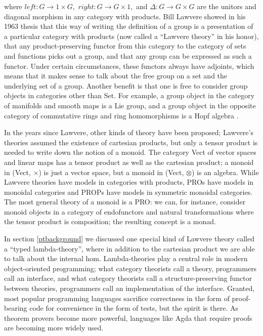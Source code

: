 \documentclass[12pt,twoside,openright]{report}
\newcommand{\maps}{\colon}
\begin{document}
where $left\maps G \to 1 \times G,$ $right\maps G \to G \times 1,$ and $\Delta\maps G \to G \times G$ are the unitors and diagonal morphism in any category with products.  Bill Lawvere showed in his 1963 thesis \cite{Lawvere} that this way of writing the definition of a group is a presentation of a particular category with products (now called a ``Lawvere theory'' in his honor), that any product-preserving functor from this category to the category of sets and functions picks out a group, and that any group can be expressed as such a functor.  Under certain circumstances, these functors always have adjoints, which means that it makes sense to talk about the free group on a set and the underlying set of a group.  Another benefit is that one is free to consider group objects in categories other than Set.  For example, a group object in the category of manifolds and smooth maps is a Lie group, and a group object in the opposite category of commutative rings and ring homomorphisms is a Hopf algebra \cite{nlabgroupobject}.

In the years since Lawvere, other kinds of theory have been proposed; Lawvere's theories assumed the existence of cartesian products, but only a tensor product is needed to write down the notion of a monoid.  The category Vect of vector spaces and linear maps has a tensor product as well as the cartesian product; a monoid in (Vect, $\times$) is just a vector space, but a monoid in (Vect, $\otimes$) is an algebra.  While Lawvere theories have models in categories with products, PROs have models in monoidal categories and PROPs have models in symmetric monoidal categories.  The most general theory of a monoid is a PRO: we can, for instance, consider monoid objects in a category of endofunctors and natural transformations where the tensor product is composition; the resulting concept is a monad.

In section \ref{ptbackground} we discussed one special kind of Lawvere theory called a ``typed lambda-theory'', where in addition to the cartesian product we are able to talk about the internal hom.  Lambda-theories play a central role in modern object-oriented programming; what category theorists call a theory, programmers call an interface, and what category theorists call a structure-preserving functor between theories, programmers call an implementation of the interface.  Granted, most popular programming languages sacrifice correctness in the form of proof-bearing code for convenience in the form of tests, but the spirit is there.  As theorem provers become more powerful, languages like Agda that require proofs are becoming more widely used.
\end{document}
